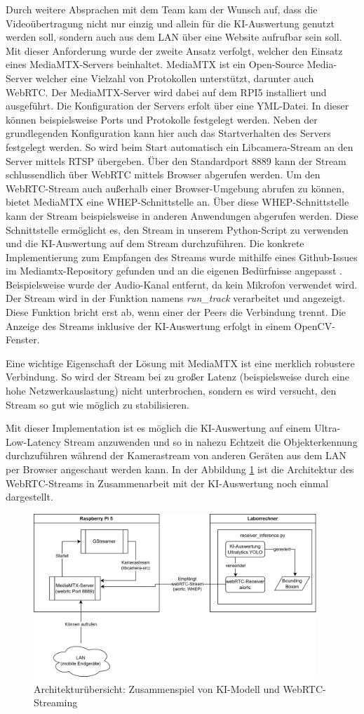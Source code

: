 Durch weitere Absprachen mit dem Team kam der Wunsch auf, dass die Videoübertragung nicht nur einzig und allein für die KI-Auswertung genutzt werden soll, sondern auch aus dem LAN über eine Website aufrufbar sein soll. Mit dieser Anforderung wurde der zweite Ansatz verfolgt, welcher den Einsatz eines MediaMTX-Servers beinhaltet. MediaMTX ist ein Open-Source Media-Server welcher eine Vielzahl von Protokollen unterstützt, darunter auch WebRTC. Der MediaMTX-Server wird dabei auf dem RPI5 installiert und ausgeführt. Die Konfiguration der Servers erfolt über eine YML-Datei.
In dieser können beispielsweise Ports und Protokolle festgelegt werden. Neben der grundlegenden Konfiguration kann hier auch das Startverhalten des Servers festgelegt werden. So wird beim Start automatisch ein Libcamera-Stream an den Server mittels RTSP übergeben. Über den Standardport 8889 kann der Stream schlussendlich über WebRTC mittels Browser abgerufen werden. Um den WebRTC-Stream auch außerhalb einer Browser-Umgebung abrufen zu können, bietet MediaMTX eine WHEP-Schnittstelle an. Über diese WHEP-Schnittstelle kann der Stream beispielsweise in anderen Anwendungen abgerufen werden. Diese Schnittstelle ermöglicht es, den Stream in unserem Python-Script zu verwenden und die KI-Auswertung auf dem Stream durchzuführen. Die konkrete Implementierung zum Empfangen des Streams wurde mithilfe eines Github-Issues im Mediamtx-Repository gefunden und an die eigenen Bedürfnisse angepasst \cite{mediamtxwebrtc}. Beispielsweise wurde der Audio-Kanal entfernt, da kein Mikrofon verwendet wird. Der Stream wird in der Funktion namens \textit{run\_track} verarbeitet und angezeigt. Diese Funktion bricht erst ab, wenn einer der Peers die Verbindung trennt. Die Anzeige des Streams inklusive der KI-Auswertung erfolgt in einem OpenCV-Fenster.

Eine wichtige Eigenschaft der Lösung mit MediaMTX ist eine merklich robustere Verbindung. So wird der Stream bei zu großer Latenz (beispielsweise durch eine hohe Netzwerkauslastung) nicht unterbrochen, sondern es wird versucht, den Stream so gut wie möglich zu stabilisieren. 

Mit dieser Implementation ist es möglich die KI-Auswertung auf einem Ultra-Low-Latency Stream anzuwenden und so in nahezu Echtzeit die Objekterkennung durchzuführen während der Kamerastream von anderen Geräten aus dem LAN per Browser angeschaut werden kann. In der Abbildung \ref{fig:KI-webRTC-Architektur} ist die Architektur des WebRTC-Streams in Zusammenarbeit mit der KI-Auswertung noch einmal dargestellt. 

\begin{figure}[H]
  \centering
  \includegraphics[width=0.95\textwidth]{images/ki-webrtc-arch.png}
  \caption{Architekturübersicht: Zusammenspiel von KI-Modell und WebRTC-Streaming}
  \label{fig:KI-webRTC-Architektur}
\end{figure}

